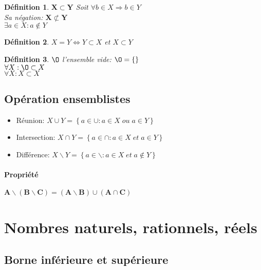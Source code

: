 \documentclass[10pt,a4paper]{book}
\newtheorem{definition}{Définition}[section]
\begin{document}
\begin{definition} $\mathbf{X \subset Y}$
Soit $\forall b \in X \Rightarrow b \in Y$ \\
Sa négation: $\mathbf{X \not\subset Y}$ \\
$\exists a \in X: a \notin Y$
\end{definition}
\begin{definition}
$X=Y \Leftrightarrow Y\subset X$ et $X\subset Y$
\end{definition}
\begin{definition}
$\O$ l'ensemble vide: $\O=\{\}$ \\
$\forall X: \O \subset X$ \\
$\forall X: X \subset X$
\end{definition}

\subsection{Opération ensemblistes}

\begin{itemize}
\item Réunion: $X\cup Y = \left\lbrace a \in \cup: a\in X \; ou\; a \in Y\right\rbrace$
\item Intersection: $X\cap Y = \left\lbrace a \in \cap: a\in X \; et\; a \in Y\right\rbrace$
\item Différence: $X\backslash Y = \left\lbrace a \in \backslash : a\in X \; et\; a\notin Y\right\rbrace$
\end{itemize}

\paragraph{Propriété} $\mathbf{A\backslash (B\backslash C) =
(A\backslash B) \cup (A\cap C)}$

\section{Nombres naturels, rationnels, réels}

\subsection{Borne inférieure et supérieure}
\end{document}
